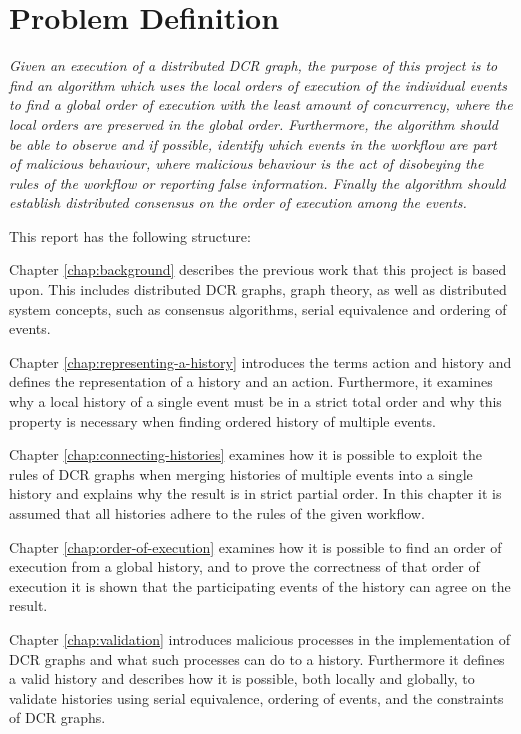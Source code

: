 \section{Problem Definition}
	\textit{Given an execution of a distributed DCR graph, the purpose of this project is to find an algorithm which uses the local orders of execution of the individual events to find a global order of execution with the least amount of concurrency, where the local orders are preserved in the global order. Furthermore, the algorithm should be able to observe and if possible, identify which events in the workflow are part of malicious behaviour, where malicious behaviour is the act of disobeying the rules of the workflow or reporting false information. Finally the algorithm should establish distributed consensus on the order of execution among the events.}
	
	\vspace{0.4cm}
	
	\newpar
	This report has the following structure:
	
	\newpar
	Chapter \ref{chap:background} describes the previous work that this project is based upon. This includes distributed DCR graphs, graph theory, as well as distributed system concepts, such as consensus algorithms, serial equivalence and ordering of events.
		
	\newpar
	Chapter \ref{chap:representing-a-history} introduces the terms action and history and defines the representation of a history and an action.
	Furthermore, it examines why a local history of a single event must be in a strict total order and why this property is necessary when finding ordered history of multiple events. 
		
	\newpar
	Chapter \ref{chap:connecting-histories} examines how it is possible to exploit the rules of DCR graphs when merging histories of multiple events into a single history and explains why the result is in strict partial order. In this chapter it is assumed that all histories adhere to the rules of the given workflow.
	
    \newpar
    Chapter \ref{chap:order-of-execution} examines how it is possible to find an order of execution from a global history, and to prove the correctness of that order of execution it is shown that the participating events of the history can agree on the result.
		
	\newpar	Chapter \ref{chap:validation} introduces malicious processes in the implementation of DCR graphs and what such processes can do to a history. Furthermore it defines a valid history and describes how it is possible, both locally and globally, to validate histories using serial equivalence, ordering of events, and the constraints of DCR graphs.